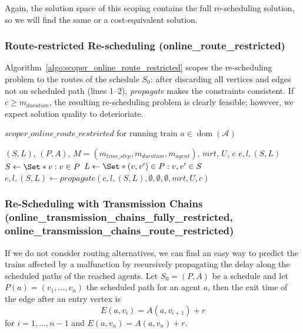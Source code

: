 \documentclass{article}
\DeclareMathOperator{\dom}{dom}
\begin{document}
Again, the solution space of this scoping contains the full re-scheduling solution, so we will find the same or a cost-equivalent solution.


\subsubsection{Route-restricted Re-scheduling (online\_route\_restricted)}
\label{subsubsec:scope_online_route_restricted}


Algorithm~\ref{algo:scoper_online_route_restricted} scopes the re-scheduling problem to the routes of the schedule $S_0$: after discarding all vertices and edges not on scheduled path (lines 1--2), \emph{propagate} makes the constraints consistent. If $c\geq m_{duration}$, the resulting re-scheduling problem is clearly feasible; however, we expect solution quality to deterioriate.

\begin{algorithm}
	\caption{$scoper\_online\_route\_restricted$ for running train $a \in \dom(\mathcal{A})$} \label{algo:scoper_online_route_restricted}
	\begin{algorithmic}[1]
		\Require $(S,L)$, $(P,A)$, $M=(m_{time\_step},m_{duration},m_{agent})$, $mrt$, $U$, $c$
	    \Ensure $e,l,(S,L)$
        \State $S \leftarrow \Set*{v: v\in P}$
        \State $L \leftarrow \Set*{(v,v^\prime) \in P: v,v^\prime \in S}$
        \State $e,l,(S,L) \leftarrow propagate(e,l,(S,L),\emptyset, \emptyset, \emptyset, mrt, U, c)$
	\end{algorithmic}
\end{algorithm}


\subsubsection{Re-Scheduling with Transmission Chains\\ (online\_transmission\_chains\_fully\_restricted,\\online\_transmission\_chains\_route\_restricted)}
\label{subsubsec:scope_online_tranmission_chains}


If we do not consider routing alternatives, we can find an easy way to predict the trains affected by a malfunction by recursively propagating the delay along the scheduled paths of the reached agents.
%
Let $S_0=(P,A)$ be a schedule and let $P(a) = (v_1,\ldots,v_n)$ the scheduled path for an agent $a$, then  the exit time of the edge after an entry vertex is
\begin{equation}
E(a,v_i) = A(a,v_{i+1}) + r
\end{equation}
for $i=1,\ldots,n-1$ and $E(a,v_n) = A(a,v_n)+r$.
\end{document}
